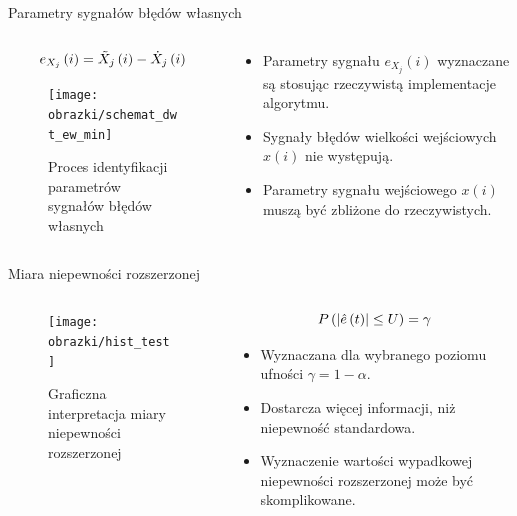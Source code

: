 \documentclass[12pt, polish, aspectratio = 169]{slides}
\begin{document}
\begin{frame}{Parametry sygnałów błędów własnych}
\begin{columns}
\begin{column}{0.6\textwidth}
	\begin{equation}
	e_{X_{j}}\left(i\right) = \tilde{X}_{j}\left(i\right) - \dot{X}_{j}\left(i\right) \label{eq:dwt_round_error}
	\end{equation}
	\begin{figure}
	\texttt{[image: obrazki/schemat\_dwt\_ew\_min]}
	\caption{Proces identyfikacji parametrów sygnałów błędów własnych}
	\end{figure}
\end{column}
\begin{column}{0.4\textwidth}
	\begin{itemize}
	\item Parametry sygnału $e_{X_{j}}(i)$ wyznaczane są stosując rzeczywistą implementacje algorytmu.
	\item Sygnały błędów wielkości wejściowych $x(i)$ nie występują.
	\item Parametry sygnału wejściowego $x(i)$ muszą być zbliżone do rzeczywistych.
	\end{itemize}
\end{column}
\end{columns}
\end{frame}


\begin{frame}{Miara niepewności rozszerzonej}
\begin{columns}
\begin{column}{0.5\textwidth}
	\begin{figure}
	\texttt{[image: obrazki/hist\_test]}
	\caption{Graficzna interpretacja miary niepewności rozszerzonej}
	\end{figure}
\end{column}
\begin{column}{0.5\textwidth}
	\begin{equation}
	P \left(\left|\hat{e} \left(t\right)\right| \le U\right) = \gamma \label{eq:unc_definition}
	\end{equation}
	\begin{itemize}
	\item Wyznaczana dla wybranego poziomu ufności $\gamma = 1 - \alpha$.
	\item Dostarcza więcej informacji, niż niepewność standardowa.
	\item Wyznaczenie wartości wypadkowej niepewności rozszerzonej może być skomplikowane.
	\end{itemize}
\end{column}
\end{columns}
\end{frame}
\end{document}

